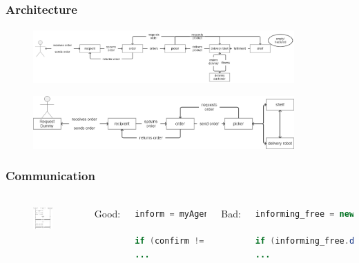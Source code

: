 \documentclass{beamer}
\begin{document}
\begin{frame}[fragile]
\frametitle{Architecture}
\framesubtitle{}

\begin{figure}
 \center
 \includegraphics[width=10cm]{architecture_old.png}
\end{figure}

\bigskip

\begin{figure}
 \center
 \includegraphics[width=10cm]{architecture_new.png}
\end{figure}

\end{frame}



\begin{frame}[fragile]
\frametitle{Communication}
\framesubtitle{}

\begin{columns}[t,onlytextwidth]

\begin{figure}
 \center
 \includegraphics[width=4cm]{communication.png}
\end{figure}

Good:
\footnotesize
\begin{lstlisting}[language=Java]
inform = myAgent.receive(MessageTemplate.MatchPerformative(ACLMessage.INFORM));
					
if (confirm != null) {
...\end{lstlisting}
\normalsize
\bigskip
Bad:
\footnotesize
\begin{lstlisting}[language=Java]
informing_free = new ReceiverBehaviour(this, timeout, MessageTemplate.MatchPerformative(ACLMessage.INFORM));

if (informing_free.done()) {
...
\end{lstlisting}

\end{columns}

\end{frame}
\end{document}
